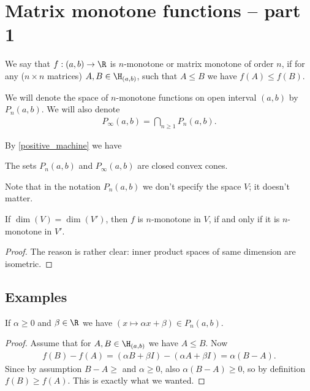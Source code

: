 \chapter{Matrix monotone functions -- part 1}

\begin{maar}\label{n_mon_maar}
	We say that $f : (a, b) \to \R$ is $n$-monotone or matrix monotone of order $n$, if for any ($n \times n$ matrices) $A, B \in \H_{(a, b)}$, such that $A \leq B$ we have $f(A) \leq f(B)$.
\end{maar}

We will denote the space of $n$-monotone functions on open interval $(a, b)$ by $P_{n}(a, b)$. We will also denote
\begin{align*}
	P_{\infty}(a, b) = \bigcap_{n \geq 1} P_{n}(a, b).
\end{align*}

By \ref{positive_machine} we have

\begin{prop}
	The sets $P_{n}(a, b)$ and $P_{\infty}(a, b)$ are closed convex cones.
\end{prop}

Note that in the notation $P_{n}(a, b)$ we don't specify the space $V$; it doesn't matter.

\begin{prop}
	If $\dim(V) = \dim(V')$, then $f$ is $n$-monotone in $V$, if and only if it is $n$-monotone in $V'$.
\end{prop}
\begin{proof}
	The reason is rather clear: inner product spaces of same dimension are isometric.
\end{proof}

\section{Examples}

\begin{prop}
	If $\alpha \geq 0$ and $\beta \in \R$ we have $(x \mapsto \alpha x + \beta) \in P_{n}(a, b)$.
\end{prop}
\begin{proof}
	Assume that for $A, B \in \H_{(a, b)}$ we have $A \leq B$. Now
	\begin{align*}
		f(B) - f(A) = (\alpha B + \beta I) - (\alpha A + \beta I) = \alpha (B - A).
	\end{align*}
	Since by assumption $B - A \geq $ and $\alpha \geq 0$, also $\alpha (B - A) \geq 0$, so by definition $f(B) \geq f(A)$. This is exactly what we wanted.
\end{proof}

